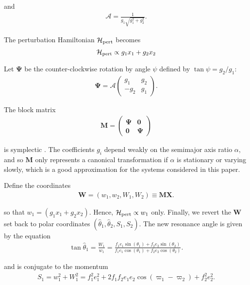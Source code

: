 \documentclass[usenatbib,twocolumn]{mnras}
\renewcommand{\v}[1]{\boldsymbol{ #1 }}
\begin{document}
\noindent and
\begin{align}
  \mathcal{A} = \frac{1}{g_1\sqrt{g_1^2+g_2^2}}.
\end{align}

\noindent The perturbation Hamiltonian \(\mathcal H_{\rm
pert}\) becomes
\begin{align}
  \mathcal H_{\rm pert} \propto g_1 x_1 + g_2 x_2
\end{align}

\noindent
Let \(\v \Psi\) be the
counter-clockwise rotation by angle \(\psi\) defined by \(\tan\psi=
g_2/g_1\):
\begin{align}
  \v \Psi =  \mathcal{A}
  \begin{pmatrix}
    g_1 & g_2 \\
    -g_2 & g_1 
  \end{pmatrix}.
\end{align}

\noindent The block matrix
\begin{align}
  \v M =
  \begin{pmatrix}
    \v \Psi & \v 0 \\
    \v 0 & \v \Psi
  \end{pmatrix}
\end{align}

\noindent is symplectic \citep{goldstein_classical_2000}.
The coefficients \(g_i\) depend weakly on the semimajor axis ratio
\(\alpha\), and so \(\v M\) only represents a canonical transformation if
\(\alpha\) is stationary or varying slowly, which is a good
approximation for the systems considered in this paper.

Define the coordinates
\begin{align}
   \v W = (w_1, w_2, W_1, W_2) \equiv \v M \v X.
\end{align}

\noindent so that \(w_1 = (g_1 x_1 + g_2 x_2)\).  Hence,
\(\mathcal H_{\rm pert}\propto w_1\) only.  Finally, we revert the \(\v
W\) set back to polar coordinates
\((\hat\theta_1,\hat\theta_2,S_1,S_2)\). The new resonance angle is
given by the equation
\begin{align}
\label{hattheta}
  \tan\hat{\theta}_1 = \frac{W_1}{w_1} = \frac{f_1 e_1\sin(\theta_1)
  + f_2e_2\sin(\theta_2)}{f_1e_1\cos(\theta_1) + f_2e_2\cos(\theta_2)}.
\end{align}

\noindent
and is conjugate to the momentum
\begin{align}
  S_1 = w_1^2 + W_1^2 = f_1^2e_1^2
  + 2f_1f_2e_1e_2\cos(\varpi_1 - \varpi_2) + f_2^2e_2^2.
\end{align}
\end{document}
